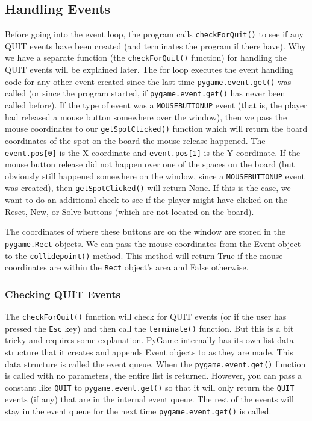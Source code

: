 \subsection{Handling Events} %
\label{sec:section label}
Before going into the event loop, the program calls \texttt{checkForQuit()} to see if any QUIT events have been created (and terminates the program if there have). Why we have a separate function (the \texttt{checkForQuit()} function) for handling the QUIT events will be explained later. The for loop executes the event handling code for any other event created since the last time \texttt{pygame.event.get()} was called (or since the program started, if \texttt{pygame.event.get()} has never been called before).
If the type of event was a \texttt{MOUSEBUTTONUP} event (that is, the player had released a mouse button somewhere over the window), then we pass the mouse coordinates to our \texttt{getSpotClicked()} function which will return the board coordinates of the spot on the board the mouse release happened. The \texttt{event.pos[0]} is the X coordinate and \texttt{event.pos[1]} is the Y coordinate.
If the mouse button release did not happen over one of the spaces on the board (but obviously still happened somewhere on the window, since a \texttt{MOUSEBUTTONUP} event was created), then \texttt{getSpotClicked()} will return None. If this is the case, we want to do an additional check to see if the player might have clicked on the Reset, New, or Solve buttons (which are not located on the board).

The coordinates of where these buttons are on the window are stored in the \texttt{pygame.Rect} objects. We can pass the mouse coordinates from the Event object to the \texttt{collidepoint()} method. This method will return True if the mouse coordinates are within the \texttt{Rect} object’s area and False otherwise.

\subsubsection{Checking QUIT Events} %
\label{sec:subsection label} %
The \texttt{checkForQuit()} function will check for QUIT events (or if the user has pressed the \texttt{Esc} key) and then call the \texttt{terminate()} function. But this is a bit tricky and requires some explanation.
PyGame internally has its own list data structure that it creates and appends Event objects to as they are made. This data structure is called the event queue. When the \texttt{pygame.event.get()} function is called with no parameters, the entire list is returned. However, you can pass a constant like \texttt{QUIT} to \texttt{pygame.event.get()} so that it will only return the \texttt{QUIT} events (if any) that are in the internal event queue. The rest of the events will stay in the event queue for the next time \texttt{pygame.event.get()} is called.

